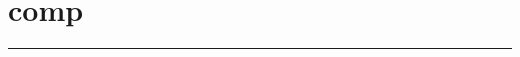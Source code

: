 \documentclass[11pt,a4paper]{article}
\begin{document}
\newpage
\section*{comp}
\hrule
\vspace{0.5cm}






\end{document}
